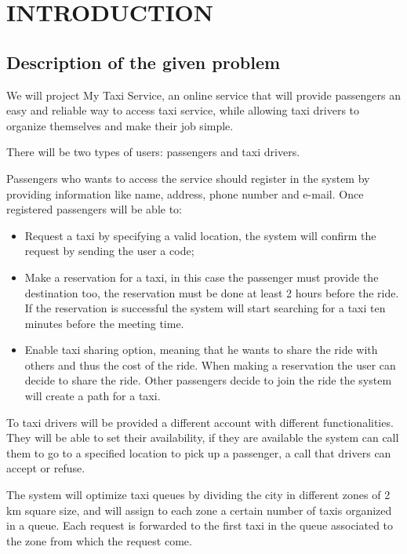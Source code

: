 
\section{INTRODUCTION}
\subsection{Description of the given problem}

We will project My Taxi Service, an online service that will provide passengers an easy and reliable way to access taxi service, while allowing taxi drivers to organize themselves and make their job simple.

There will be two types of users: passengers and taxi drivers.

Passengers who wants to access the service should register in the system by providing information like name, address, phone number and e-mail. 
Once registered passengers will be able to: 
\begin{itemize}
	\item Request a taxi by specifying a valid location, the system will confirm the request by sending the user a code;
	\item Make a reservation for a taxi, in this case the passenger must provide the destination too, the reservation must be done at least 2 hours before the ride. If the reservation is successful the system will start searching for a taxi ten minutes before the meeting time.
	\item Enable taxi sharing option, meaning that he wants to share the ride with others and thus the cost of the ride. When making a reservation the user can decide to share the ride. Other passengers decide to join the ride the system will create a path for a taxi.
\end{itemize}

To taxi drivers will be provided a different account with different functionalities. They will be able to set their availability, if they are available the system can call them to go to a specified location to pick up a passenger, a call that drivers can accept or refuse.

The system will optimize taxi queues by dividing the city in different zones of 2 km square size, and will assign to each zone a certain number of taxis organized in a queue. Each request is forwarded to the first taxi in the queue associated to the zone from which the request come.

